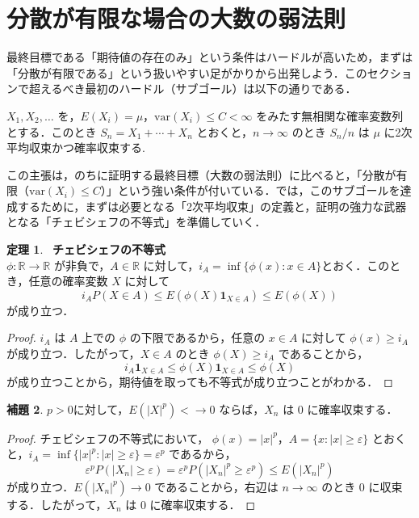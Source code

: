 \documentclass[dvipdfmx]{jsarticle}
\numberwithin{equation}{section}
\theoremstyle{definition}
\newtheorem{thm}{定理}[section]
\newtheorem{lem}[thm]{補題}
\newcommand{\R}{\mathbb{R}}
\newcommand{\0}{\bm{0}}
\newcommand{\1}{\bm{1}}
\begin{document}
\section{分散が有限な場合の大数の弱法則}

最終目標である「期待値の存在のみ」という条件はハードルが高いため，まずは「分散が有限である」という扱いやすい足がかりから出発しよう．このセクションで超えるべき最初のハードル（サブゴール）は以下の通りである．
\begin{tcolorbox}[
    colback=white,          %
    colframe=black,         %
    arc=0mm,                %
    boxrule=0.5pt,          %
    title={本節のゴール：$L^2$弱法則},
    coltitle=black,         %
    attach title to upper,  %
    after title={\medskip\hrule\medskip} %
]
  $X_1, X_2, \dots$ を，$E(X_i) = \mu$，$\mathrm{var}(X_i) \le C < \infty$ をみたす無相関な確率変数列とする．このとき $S_n = X_1 + \cdots + X_n$ とおくと，$n \to \infty$ のとき $S_n/n$ は $\mu$ に2次平均収束かつ確率収束する.
\end{tcolorbox}

この主張は，のちに証明する最終目標（大数の弱法則）に比べると，「分散が有限（$\mathrm{var}(X_i) \le C$）」という強い条件が付いている．では，このサブゴールを達成するために，まずは必要となる「2次平均収束」の定義と，証明の強力な武器となる「チェビシェフの不等式」を準備していく．

\begin{thm}\
\textbf{チェビシェフの不等式}\\
  $\phi:\R \to \R$ が非負で，$A\in\mathbb{R}$ に対して，$i_A=\inf\{\phi(x):x\in A\}$とおく．このとき，任意の確率変数 $X$ に対して
    \[i_A P(X\in A) \leq E(\phi(X)\1_{X\in A}) \leq E(\phi(X))\]
    が成り立つ．  
\end{thm}
\begin{proof}
  $i_A$ は $A$ 上での $\phi$ の下限であるから，任意の $x\in A$ に対して $\phi(x)\geq i_A$ が成り立つ．したがって，$X\in A$ のとき $\phi(X)\geq i_A$ であることから，
  \[
    i_A \1_{X\in A} \leq \phi(X)\1_{X\in A} \leq \phi(X)
  \]
  が成り立つことから，期待値を取っても不等式が成り立つことがわかる．
\end{proof}

\begin{lem}
  $p>0$に対して，$E(|X|^p)< \rightarrow0$ ならば，$X_n$ は $0$ に確率収束する．
\end{lem}
\begin{proof}
  チェビシェフの不等式において， $\phi(x)=|x|^p$，$A=\{x:|x|\geq \varepsilon\}$ とおくと，$i_A=\inf\{|x|^p:|x|\geq \varepsilon\}=\varepsilon^p$ であるから， 
  \[
    \varepsilon^p P(|X_n| \geq \varepsilon) =\varepsilon^p P(|X_n|^p \geq \varepsilon^p)\leq E(|X_n|^p)
  \]
  が成り立つ．$E(|X_n|^p) \to 0$ であることから，右辺は $n \to \infty$ のとき $0$ に収束する．したがって，$X_n$ は $0$ に確率収束する．
\end{proof} 
\end{document}
